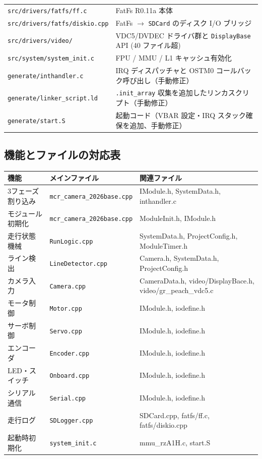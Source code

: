 \documentclass[a4paper,11pt,dvipdfmx]{jsarticle}
\begin{document}
\begin{longtable}{l p{92mm}}
\texttt{src/drivers/fatfs/ff.c}     & FatFs R0.11a 本体 \\
\texttt{src/drivers/fatfs/diskio.cpp} & FatFs $\rightarrow$ \texttt{SDCard} のディスク I/O ブリッジ \\
\texttt{src/drivers/video/}         & VDC5/DVDEC ドライバ群と \texttt{DisplayBase} API (40 ファイル超) \\
\texttt{src/system/system\_init.c}  & FPU / MMU / L1 キャッシュ有効化 \\
\texttt{generate/inthandler.c}      & IRQ ディスパッチャと OSTM0 コールバック呼び出し（手動修正） \\
\texttt{generate/linker\_script.ld} & \texttt{.init\_array} 収集を追加したリンカスクリプト（手動修正） \\
\texttt{generate/start.S}           & 起動コード（VBAR 設定・IRQ スタック確保を追加、手動修正） \\
\bottomrule
\end{longtable}

\subsection{機能とファイルの対応表}

\begin{tabularx}{\textwidth}{l l X}
\toprule
\textbf{機能} & \textbf{メインファイル} & \textbf{関連ファイル} \\
\midrule
3フェーズ割り込み & \texttt{mcr\_camera\_2026base.cpp} & IModule.h, SystemData.h, inthandler.c \\
モジュール初期化 & \texttt{mcr\_camera\_2026base.cpp} & ModuleInit.h, IModule.h \\
走行状態機械     & \texttt{RunLogic.cpp}    & SystemData.h, ProjectConfig.h, ModuleTimer.h \\
ライン検出       & \texttt{LineDetector.cpp}& Camera.h, SystemData.h, ProjectConfig.h \\
カメラ入力       & \texttt{Camera.cpp}      & CameraData.h, video/DisplayBace.h, video/gr\_peach\_vdc5.c \\
モータ制御       & \texttt{Motor.cpp}       & IModule.h, iodefine.h \\
サーボ制御       & \texttt{Servo.cpp}       & IModule.h, iodefine.h \\
エンコーダ       & \texttt{Encoder.cpp}     & IModule.h, iodefine.h \\
LED・スイッチ    & \texttt{Onboard.cpp}     & IModule.h, iodefine.h \\
シリアル通信     & \texttt{Serial.cpp}      & IModule.h, iodefine.h \\
走行ログ         & \texttt{SDLogger.cpp}    & SDCard.cpp, fatfs/ff.c, fatfs/diskio.cpp \\
起動時初期化     & \texttt{system\_init.c}  & mmu\_rzA1H.c, start.S \\
\bottomrule
\end{tabularx}
\end{document}
